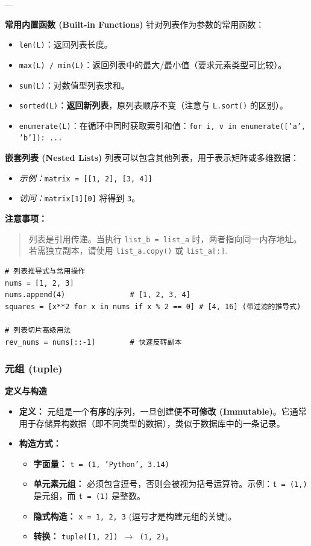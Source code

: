 \documentclass{article}
\begin{document}
---

\textbf{常用内置函数 (Built-in Functions)}
针对列表作为参数的常用函数：
\begin{itemize}
    \item \texttt{len(L)}：返回列表长度。
    \item \texttt{max(L) / min(L)}：返回列表中的最大/最小值（要求元素类型可比较）。
    \item \texttt{sum(L)}：对数值型列表求和。
    \item \texttt{sorted(L)}：\textbf{返回新列表}，原列表顺序不变（注意与 \texttt{L.sort()} 的区别）。
    \item \texttt{enumerate(L)}：在循环中同时获取索引和值：\texttt{for i, v in enumerate(['a', 'b']): ...}
\end{itemize}

\textbf{嵌套列表 (Nested Lists)}
列表可以包含其他列表，用于表示矩阵或多维数据：
\begin{itemize}
    \item \textit{示例：}\texttt{matrix = [[1, 2], [3, 4]]}
    \item \textit{访问：}\texttt{matrix[1][0]} 将得到 \texttt{3}。
\end{itemize}

\textbf{注意事项：}
\begin{quote}
列表是引用传递。当执行 \texttt{list\_b = list\_a} 时，两者指向同一内存地址。若需独立副本，请使用 \texttt{list\_a.copy()} 或 \texttt{list\_a[:]}.
\end{quote}

\begin{lstlisting}[caption=列表高级操作]
# 列表推导式与常用操作
nums = [1, 2, 3]
nums.append(4)               # [1, 2, 3, 4]
squares = [x**2 for x in nums if x % 2 == 0] # [4, 16] (带过滤的推导式)

# 列表切片高级用法
rev_nums = nums[::-1]        # 快速反转副本
\end{lstlisting}

\subsubsection{元组 (tuple)}

\textbf{定义与构造}
\begin{itemize}
    \item \textbf{定义：} 元组是一个\textbf{有序}的序列，一旦创建便\textbf{不可修改 (Immutable)}。它通常用于存储异构数据（即不同类型的数据），类似于数据库中的一条记录。
    \item \textbf{构造方式：}
    \begin{itemize}
        \item \textbf{字面量：} \texttt{t = (1, 'Python', 3.14)}
        \item \textbf{单元素元组：} 必须包含逗号，否则会被视为括号运算符。示例：\texttt{t = (1,)} 是元组，而 \texttt{t = (1)} 是整数。
        \item \textbf{隐式构造：} \texttt{x = 1, 2, 3} (逗号才是构建元组的关键)。
        \item \textbf{转换：} \texttt{tuple([1, 2]) $\rightarrow$ (1, 2)}。
    \end{itemize}
\end{itemize}
\end{document}
